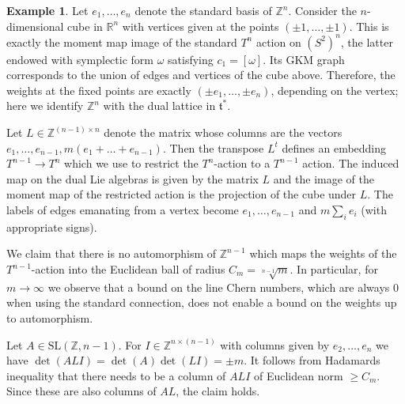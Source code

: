 \documentclass[12pt,a4paper]{amsart}
\newcommand{\SL}{\mathrm{SL}}
\newcommand{\RR}{\mathbb{R}}
\newcommand{\ZZ}{\mathbb{Z}}
\newcommand{\NN}{\mathbb{N}}
\theoremstyle{plain}
\theoremstyle{definition}
\newtheorem{ex}[thm]{Example}
\begin{document}
\begin{ex}\label{ex: long weights} Let $e_1,\ldots,e_n$ denote the standard basis of $\ZZ^n$.
Consider the $n$-dimensional cube in $\RR^n$ with vertices given at the points $(\pm 1, \ldots, \pm 1)$. This is exactly the moment map image
of the standard $T^n$ action on $(S^2)^n$, the latter endowed with symplectic form $\omega$ satisfying $c_1=[\omega]$. 
Its GKM graph corresponds to the union of edges and vertices of the cube above. Therefore, the weights at the fixed points
are exactly $(\pm e_1,\ldots, \pm e_n)$, depending on the vertex; here we identify $\ZZ^n$
with the dual lattice in $\mathfrak{t}^*$.
 
Let $L\in \ZZ^{(n-1)\times n}$ denote the matrix whose columns are the vectors
$e_1,\ldots,e_{n-1},m(e_1+\ldots+e_{n-1})$. Then the transpose $L^t$ defines an embedding
$T^{n-1}\rightarrow T^n$ which we use to restrict the $T^n$-action to a $T^{n-1}$ action.
The induced map on the dual Lie algebras is given by the matrix $L$ and the image of the
moment map of the restricted action is the projection of the cube under $L$. The labels
of edges emanating from a vertex become $e_1,\ldots,e_{n-1}$ and $m\sum_i e_i$
(with appropriate signs).


We claim that there is no automorphism of $\ZZ^{n-1}$ which maps the
weights of the $T^{n-1}$-action into the Euclidean ball of radius $C_m=\sqrt[n-1]{m}$. In
particular, for $m\to\infty$ we observe that a bound on the line Chern numbers,
which are always $0$ when using the standard connection, does not
enable a bound on the weights up to automorphism.
 
Let $A\in \SL(\ZZ,n-1)$. For $I\in \ZZ^{n\times (n-1)}$ with columns given by
$e_2,\ldots,e_n$ we have $\det(ALI)=\det(A)\det(LI)=\pm m$. It follows from Hadamards
inequality \cite{hadamard93, MR2978290} that there needs to be a column of $ALI$ of Euclidean norm $\geq C_m$. Since
these are also columns of $AL$, the claim holds.
\end{ex}
\end{document}
